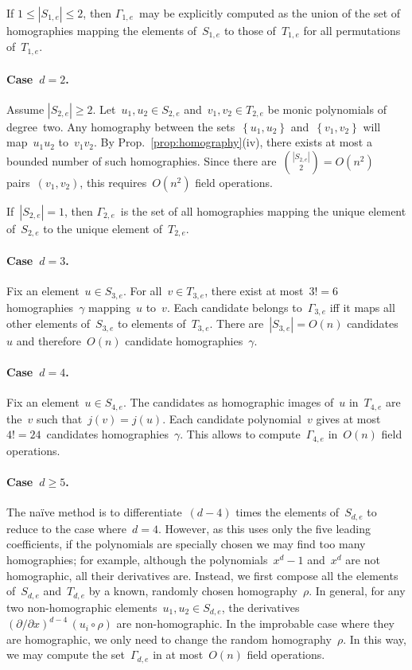 \documentclass{amsart}
\let\realpar\paragraph
\def\paragraph#1{\realpar{\textbf{#1}}}
\def\acco#1{\left\{#1\right\}}
\def\abs#1{\left|#1\right|}
\def\card#1{\abs{#1}}
\begin{document}
If $1 ≤ \card{S_{1,e}} ≤ 2$, then $Γ_{1,e}$~may be explicitly computed as
the union of the set of homographies mapping the elements of~$S_{1,e}$ to
those of~$T_{1,e}$ for all permutations of~$T_{1,e}$.

\paragraph{Case~$d = 2$.}
Assume $\card{S_{2,e}} ≥ 2$. Let~$u_1, u_2 ∈ S_{2,e}$ and~$v_1, v_2 ∈
T_{2,e}$ be monic polynomials of degree~two. Any homography between the
sets~$\acco{u_1, u_2}$ and~$\acco{v_1, v_2}$ will map~$u_1 u_2$ to~$v_1
v_2$. By Prop.~\ref{prop:homography}(iv), there exists at most a bounded
number of such homographies. Since there are~$\binom{\card{S_{2,e}}}{2} =
O(n^2)$ pairs~$(v_1, v_2)$, this requires~$O(n^2)$ field operations.

If~$\card{S_{2,e}} = 1$, then $Γ_{2,e}$~is the set of all homographies
mapping the unique element of~$S_{2,e}$ to the unique element
of~$T_{2,e}$.

\paragraph{Case~$d = 3$.}
Fix an element~$u ∈ S_{3,e}$. For all~$v ∈ T_{3,e}$, there exist at
most~$3! = 6$ homographies~$γ$ mapping~$u$ to~$v$. Each candidate belongs
to~$Γ_{3,e}$ iff it maps all other elements of~$S_{3,e}$ to elements
of~$T_{3,e}$. There are~$\card{S_{3,e}} = O(n)$ candidates~$u$ and
therefore~$O(n)$ candidate homographies~$γ$.

\paragraph{Case~$d = 4$.}
Fix an element~$u ∈ S_{4,e}$. The candidates as homographic images of~$u$
in~$T_{4,e}$ are the~$v$ such that~$j(v) = j(u)$. Each candidate
polynomial~$v$ gives at most $4! = 24$~candidates homographies~$γ$. This
allows to compute~$Γ_{4,e}$ in~$O(n)$ field operations.

\paragraph{Case~$d ≥ 5$.} The naïve method is to differentiate~$(d-4)$
times the elements of~$S_{d,e}$ to reduce to the case where~$d = 4$.
However, as this uses only the five leading coefficients, if the
polynomials are specially chosen we may find too many homographies; for
example, although the polynomials~$x^d-1$ and~$x^d$ are not homographic,
all their derivatives are. Instead, we first compose all the elements
of~$S_{d,e}$ and~$T_{d,e}$ by a known, randomly chosen homography~$ρ$. In
general, for any two non-homographic elements~$u_1, u_2 ∈ S_{d,e}$, the
derivatives~$(∂/∂x)^{d-4}\, (u_i ∘ ρ)$ are non-homographic. In the improbable
case where they are homographic, we only need to change the random
homography~$ρ$. In this way, we may compute the set~$Γ_{d,e}$ in at
most~$O(n)$ field operations.
\end{document}
